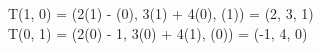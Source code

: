 T(1, 0) = (2(1) - (0), 3(1) + 4(0), (1)) = (2, 3, 1)\\
T(0, 1) = (2(0) - 1, 3(0) + 4(1), (0)) = (-1, 4, 0)